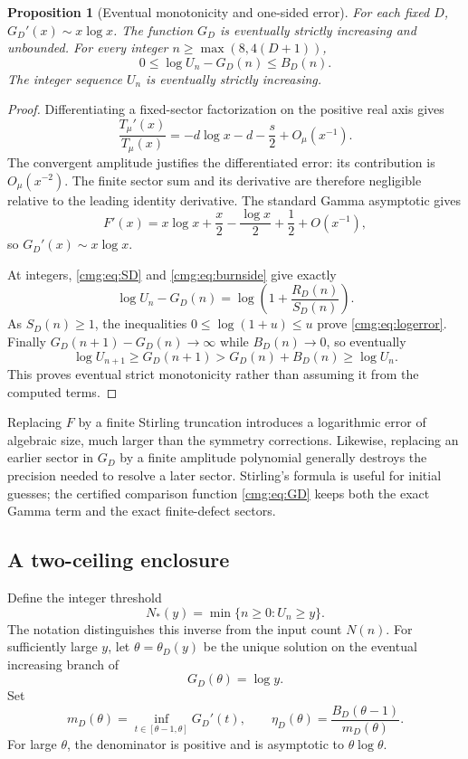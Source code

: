 \documentclass[11pt,letterpaper]{article}
\numberwithin{equation}{section}
\newtheorem{proposition}[theorem]{Proposition}
\theoremstyle{definition}\newtheorem{definition}[theorem]{Definition}
\theoremstyle{remark}\newtheorem{remark}[theorem]{Remark}
\begin{document}
\begin{proposition}[Eventual monotonicity and one-sided error]\label{cmg:prop:inverse-error}
For each fixed $D$, $G_D'(x)\sim x\log x$. The function $G_D$ is eventually strictly increasing and unbounded. For every integer $n\ge\max(8,4(D+1))$,
\begin{equation}\label{cmg:eq:logerror}
 0\le\log U_n-G_D(n)\le B_D(n).
\end{equation}
The integer sequence $U_n$ is eventually strictly increasing.
\end{proposition}
\begin{proof}
Differentiating a fixed-sector factorization on the positive real axis gives
\[
 \frac{T_\mu'(x)}{T_\mu(x)}=-d\log x-d-\frac s2+O_\mu(x^{-1}).
\]
The convergent amplitude justifies the differentiated error: its contribution is $O_\mu(x^{-2})$. The finite sector sum and its derivative are therefore negligible relative to the leading identity derivative. The standard Gamma asymptotic gives
\[
 F'(x)=x\log x+\frac x2-\frac{\log x}{2}+\frac12+O(x^{-1}),
\]
so $G_D'(x)\sim x\log x$.

At integers, \eqref{cmg:eq:SD} and \eqref{cmg:eq:burnside} give exactly
\[
 \log U_n-G_D(n)=\log\left(1+\frac{R_D(n)}{S_D(n)}\right).
\]
As $S_D(n)\ge1$, the inequalities $0\le\log(1+u)\le u$ prove \eqref{cmg:eq:logerror}. Finally $G_D(n+1)-G_D(n)\to\infty$ while $B_D(n)\to0$, so eventually
\[
 \log U_{n+1}\ge G_D(n+1)>G_D(n)+B_D(n)\ge\log U_n.
\]
This proves eventual strict monotonicity rather than assuming it from the computed terms.
\end{proof}

Replacing $F$ by a finite Stirling truncation introduces a logarithmic error of algebraic size, much larger than the symmetry corrections. Likewise, replacing an earlier sector in $G_D$ by a finite amplitude polynomial generally destroys the precision needed to resolve a later sector. Stirling's formula is useful for initial guesses; the certified comparison function \eqref{cmg:eq:GD} keeps both the exact Gamma term and the exact finite-defect sectors.

\subsection{A two-ceiling enclosure}
Define the integer threshold
\begin{equation}\label{cmg:eq:Nthreshold}
 N_*(y)=\min\{n\ge0:U_n\ge y\}.
\end{equation}
The notation distinguishes this inverse from the input count $N(n)$. For sufficiently large $y$, let $\theta=\theta_D(y)$ be the unique solution on the eventual increasing branch of
\begin{equation}\label{cmg:eq:theta}
 G_D(\theta)=\log y.
\end{equation}
Set
\begin{equation}\label{cmg:eq:eta}
 m_D(\theta)=\inf_{t\in[\theta-1,\theta]}G_D'(t),\qquad
 \eta_D(\theta)=\frac{B_D(\theta-1)}{m_D(\theta)}.
\end{equation}
For large $\theta$, the denominator is positive and is asymptotic to $\theta\log\theta$.
\end{document}
